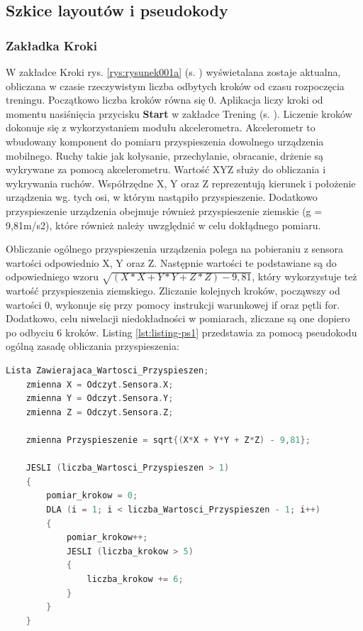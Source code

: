 \subsection{Szkice layoutów i pseudokody}		%

\subsubsection{Zakładka Kroki} %

\hspace{0.60cm}W zakładce Kroki rys. \ref{rys:rysunek001a} (s. \pageref{rys:rysunek001a}) wyświetalana zostaje aktualna, obliczana w czasie rzeczywistym liczba odbytych kroków od czasu rozpoczęcia treningu. Początkowo liczba kroków równa się 0. Aplikacja liczy kroki od momentu nasiśnięcia przycisku \textbf{Start} w zakładce Trening (s. \pageref{rys:rysunek001b}). Liczenie kroków dokonuje się z wykorzystaniem modułu akcelerometra. Akcelerometr to wbudowany komponent do pomiaru przyspieszenia dowolnego urządzenia mobilnego. Ruchy takie jak kołysanie, przechylanie, obracanie, drżenie są wykrywane za pomocą akcelerometru. Wartość XYZ służy do obliczania i wykrywania ruchów. Współrzędne X, Y oraz Z reprezentują kierunek i położenie urządzenia wg. tych osi, w którym nastąpiło przyspieszenie. Dodatkowo przyspieszenie urządzenia obejmuje również przyspieszenie ziemskie (g = 9,81m/s2), które również należy uwzględnić w celu dokłądnego pomiaru.

Obliczanie ogólnego przyspieszenia urządzenia polega na pobieraniu z sensora wartości odpowiednio X, Y oraz Z. Następnie wartości te podstawiane są do odpowiedniego wzoru $\sqrt{(X*X + Y*Y + Z*Z) - 9,81}$, który wykorzystuje też wartość przyspieszenia ziemskiego. Zliczanie kolejnych kroków, począwszy od wartości 0, wykonuje się przy pomocy instrukcji warunkowej if oraz pętli for. Dodatkowo, celu niwelacji niedokładności w pomiarach, zliczane są one dopiero po odbyciu 6 kroków. Listing \ref{lst:listing-ps1} przedstawia za pomocą pseudokodu ogólną zasadę obliczania przyspieszenia:

\begin{lstlisting}[caption=Pseudokod działania krokomierza, label={lst:listing-ps1}, language=C++]
	Lista Zawierajaca_Wartosci_Przyspieszen;
	zmienna X = Odczyt.Sensora.X;
	zmienna Y = Odczyt.Sensora.Y;
	zmienna Z = Odczyt.Sensora.Z;
	
	zmienna Przyspieszenie = sqrt{(X*X + Y*Y + Z*Z) - 9,81};
	
	JESLI (liczba_Wartosci_Przyspieszen > 1)
	{
		pomiar_krokow = 0;
		DLA (i = 1; i < liczba_Wartosci_Przyspieszen - 1; i++)
		{
			pomiar_krokow++;
			JESLI (liczba_krokow > 5)
			{
				liczba_krokow += 6;
			}
		}
	}
\end{lstlisting}


